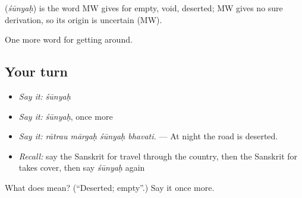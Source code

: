 \begin{cousinweb}
\textbf{} (\emph{śūnyaḥ}) is the word MW gives for empty, void, deserted; MW gives no sure derivation, so its origin is uncertain (MW).
\end{cousinweb}

\begin{grammarlens}[title={What you've built}]
One more word for getting around.
\end{grammarlens}

\subsection*{Your turn}
\begin{itemize}
\raggedright
  \item \emph{Say it:} \emph{śūnyaḥ}
  \item \emph{Say it:} \emph{śūnyaḥ}, once more
  \item \emph{Say it:} \emph{rātrau mārgaḥ śūnyaḥ bhavati.} — At night the road is deserted.
  \item \emph{Recall:} say the Sanskrit for travel through the country, then the Sanskrit for takes cover, then say \emph{śūnyaḥ} again
\end{itemize}

\begin{tcolorbox}[breakable,colback=teal!4,colframe=teal!35!black,title={Before you move on}]
What does  mean? (\textquotedblleft{}Deserted; empty\textquotedblright{}.) Say it once more.
\end{tcolorbox}

